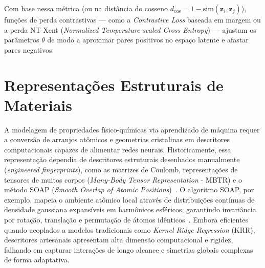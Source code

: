 Com base nessa métrica (ou na distância do cosseno $d_{\cos} = 1 - \text{sim}(\mathbf{z}_i, \mathbf{z}_j)$), funções de perda contrastivas — como a \textit{Contrastive Loss} baseada em margem ou a perda NT-Xent (\textit{Normalized Temperature-scaled Cross Entropy}) — ajustam os parâmetros $\theta$ de modo a aproximar pares positivos no espaço latente e afastar pares negativos.


\section{Representações Estruturais de Materiais} \label{sec:rb_rs}

A modelagem de propriedades físico-químicas via aprendizado de máquina requer a conversão de arranjos atômicos e geometrias cristalinas em descritores computacionais capazes de alimentar redes neurais. Historicamente, essa representação dependia de descritores estruturais desenhados manualmente (\textit{engineered fingerprints}), como as matrizes de Coulomb, representações de tensores de muitos corpos (\textit{Many-Body Tensor Representation} - MBTR) e o método SOAP (\textit{Smooth Overlap of Atomic Positions})~\cite{bartok2013representing}. O algoritmo SOAP, por exemplo, mapeia o ambiente atômico local através de distribuições contínuas de densidade gaussiana expansíveis em harmônicos esféricos, garantindo invariância por rotação, translação e permutação de átomos idênticos~\cite{bartok2013representing}. Embora eficientes quando acoplados a modelos tradicionais como \textit{Kernel Ridge Regression} (KRR), descritores artesanais apresentam alta dimensão computacional e rigidez, falhando em capturar interações de longo alcance e simetrias globais complexas de forma adaptativa.


